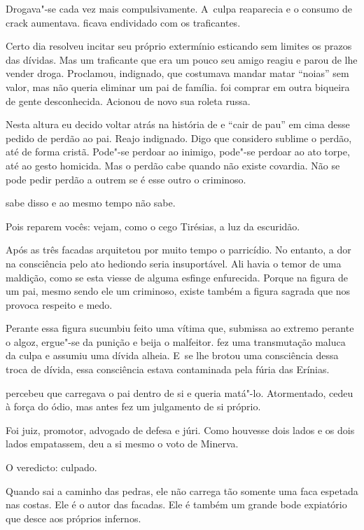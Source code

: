 Drogava"-se cada vez mais compulsivamente. A~culpa reaparecia e o consumo
de crack aumentava.  ficava endividado com os traficantes.

Certo dia  resolveu incitar seu próprio extermínio esticando sem
limites os prazos das dívidas. Mas um traficante que era um pouco seu
amigo reagiu e parou de lhe vender droga. Proclamou, indignado, que
costumava mandar matar ``noias'' sem valor, mas não queria eliminar um pai
de família.  foi comprar em outra biqueira de gente desconhecida.
Acionou de novo sua roleta russa.

Nesta altura eu decido voltar atrás na história de  e ``cair de pau''
em cima desse pedido de perdão ao pai. Reajo indignado. Digo que
considero sublime o perdão, até de forma cristã. Pode"-se perdoar ao
inimigo, pode"-se perdoar ao ato torpe, até ao gesto homicida. Mas o
perdão cabe quando não existe covardia. Não se pode pedir perdão a
outrem se é esse outro o criminoso.

 sabe disso e ao mesmo tempo não sabe.

Pois reparem vocês: vejam, como o cego Tirésias, a luz da escuridão.

Após as três facadas  arquitetou por muito tempo o parricídio. No
entanto, a dor na consciência pelo ato hediondo seria insuportável. Ali
havia o temor de uma maldição, como se esta viesse de alguma esfinge
enfurecida. Porque na figura de um pai, mesmo sendo ele um criminoso,
existe também a figura sagrada que nos provoca respeito e medo.

Perante essa figura  sucumbiu feito uma vítima que, submissa ao
extremo perante o algoz, ergue"-se da punição e beija o malfeitor.  fez
uma transmutação maluca da culpa e assumiu uma dívida alheia. E~se lhe
brotou uma consciência dessa troca de dívida, essa consciência estava
contaminada pela fúria das Erínias.

 percebeu que carregava o pai dentro de si e queria matá"-lo.
Atormentado, cedeu à força do ódio, mas antes fez um julgamento de si
próprio.

Foi juiz, promotor, advogado de defesa e júri. Como houvesse dois lados
e os dois lados empatassem,  deu a si mesmo o voto de Minerva.

O veredicto: culpado.

\asterisc{}

Quando  sai a caminho das pedras, ele não carrega tão somente uma faca
espetada nas costas. Ele é o autor das facadas. Ele é também um grande
bode expiatório que desce aos próprios infernos.

